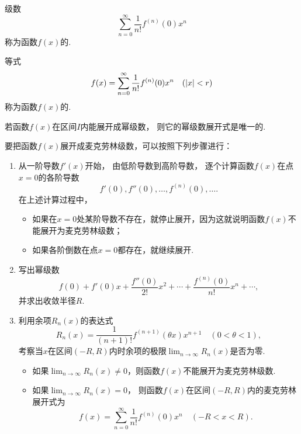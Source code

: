 \begin{definition}
级数\begin{equation*}
	\sum_{n=0}^\infty \frac{1}{n!} f^{(n)}(0) x^n
\end{equation*}
称为函数\(f(x)\)的.

等式\begin{equation*}
	f(x) = \sum_{n=0}^\infty {\frac{1}{n!} f^{(n)}(0) x^n}
	\quad(\abs{x} < r)
\end{equation*}
称为函数\(f(x)\)的.
\end{definition}

\begin{theorem}
若函数\(f(x)\)在区间\(I\)内能展开成幂级数，
则它的幂级数展开式是唯一的.
\end{theorem}

要把函数\(f(x)\)展开成麦克劳林级数，可以按照下列步骤进行：
\begin{algorithm}[麦克劳林展开]\label{algorithm:函数项级数.麦克劳林展开}
\hfill
\begin{enumerate}
	\item 从一阶导数\(f'(x)\)开始，
	由低阶导数到高阶导数，
	逐个计算函数\(f(x)\)在点\(x=0\)的各阶导数\begin{equation*}
		f'(0),f''(0),\dotsc,f^{(n)}(0),\dotsc.
	\end{equation*}
	在上述计算过程中，
	\begin{itemize}
		\item 如果在\(x=0\)处某阶导数不存在，就停止展开，因为这就说明函数\(f(x)\)不能展开为麦克劳林级数；

		\item 如果各阶倒数在点\(x=0\)都存在，就继续展开.
	\end{itemize}

	\item 写出幂级数\begin{equation*}
		f(0) + f'(0) x + \frac{f''(0)}{2!} x^2 + \dotsb + \frac{f^{(n)}(0)}{n!} x^n + \dotsb,
	\end{equation*}
	并求出收敛半径\(R\).

	\item 利用余项\(R_n(x)\)的表达式\begin{equation*}
		R_n(x) = \frac{1}{(n+1)!} f^{(n+1)}(\theta x) x^{n+1}
		\quad(0 < \theta < 1),
	\end{equation*}
	考察当\(x\)在区间\((-R,R)\)内时余项的极限\(\lim_{n\to\infty} R_n(x)\)是否为零.
	\begin{itemize}
		\item 如果\(\lim_{n\to\infty} R_n(x) \neq 0\)，则函数\(f(x)\)不能展开为麦克劳林级数.

		\item 如果\(\lim_{n\to\infty} R_n(x) = 0\)，
		则函数\(f(x)\)在区间\((-R,R)\)内的麦克劳林展开式为\begin{equation*}
			f(x) = \sum_{n=0}^\infty \frac{1}{n!} f^{(n)}(0) x^n
			\quad(-R < x < R).
		\end{equation*}
	\end{itemize}
\end{enumerate}
\end{algorithm}

